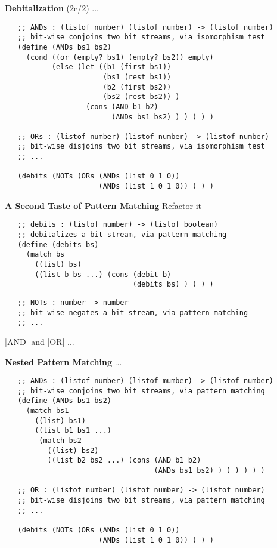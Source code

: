 \documentclass[12pt]{beamer}
\begin{document}
\begin{frame}[fragile]{{\bf Debitalization} (2c/2)}
 ...

 \pause

 {\scriptsize
  \begin{verbatim}
   ;; ANDs : (listof number) (listof number) -> (listof number)
   ;; bit-wise conjoins two bit streams, via isomorphism test
   (define (ANDs bs1 bs2)
     (cond ((or (empty? bs1) (empty? bs2)) empty)
           (else (let ((b1 (first bs1))
                       (bs1 (rest bs1))
                       (b2 (first bs2))
                       (bs2 (rest bs2)) )
                   (cons (AND b1 b2)
                         (ANDs bs1 bs2) ) ) ) ) )

   ;; ORs : (listof number) (listof number) -> (listof number)
   ;; bit-wise disjoins two bit streams, via isomorphism test
   ;; ...

   (debits (NOTs (ORs (ANDs (list 0 1 0))
                      (ANDs (list 1 0 1 0)) ) ) )
  \end{verbatim}
 }
\end{frame}

\begin{frame}[fragile]{\bf A Second Taste of Pattern Matching}
 Refactor it
 {\scriptsize
  \begin{verbatim}
   ;; debits : (listof number) -> (listof boolean)
   ;; debitalizes a bit stream, via pattern matching
   (define (debits bs)
     (match bs
       ((list) bs)
       ((list b bs ...) (cons (debit b)
                              (debits bs) ) ) ) )
  \end{verbatim}
 }

 \pause

 {\scriptsize
  \begin{verbatim}
   ;; NOTs : number -> number
   ;; bit-wise negates a bit stream, via pattern matching
   ;; ...
  \end{verbatim}
 }

 \pause

 |AND| and |OR| ...
\end{frame}

\begin{frame}[fragile]{\bf Nested Pattern Matching}
 ...

 {\scriptsize
  \begin{verbatim}
   ;; ANDs : (listof number) (listof mumber) -> (listof number)
   ;; bit-wise conjoins two bit streams, via pattern matching
   (define (ANDs bs1 bs2)
     (match bs1
       ((list) bs1)
       ((list b1 bs1 ...)
        (match bs2
          ((list) bs2)
          ((list b2 bs2 ...) (cons (AND b1 b2)
                                   (ANDs bs1 bs2) ) ) ) ) ) )

   ;; OR : (listof number) (listof number) -> (listof number)
   ;; bit-wise disjoins two bit streams, via pattern matching
   ;; ...

   (debits (NOTs (ORs (ANDs (list 0 1 0))
                      (ANDs (list 1 0 1 0)) ) ) )
  \end{verbatim}
 }
\end{frame}
\end{document}
